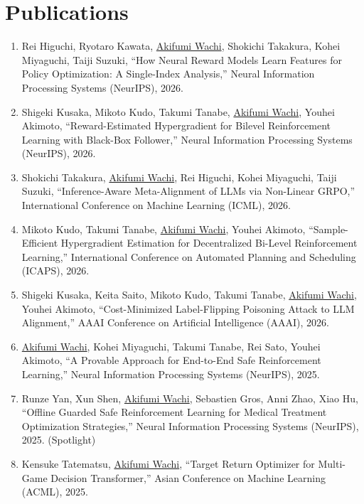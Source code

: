 \newcommand{\aw}{\underline{Akifumi Wachi}}
\section{Publications}

\begin{enumerate}[leftmargin=*,itemsep=0.35em]

\item
Rei Higuchi, Ryotaro Kawata, \aw, Shokichi Takakura, Kohei Miyaguchi, Taiji Suzuki,
``How Neural Reward Models Learn Features for Policy Optimization: A Single-Index Analysis,''
Neural Information Processing Systems (NeurIPS), 2026.

\item
Shigeki Kusaka, Mikoto Kudo, Takumi Tanabe, \aw, Youhei Akimoto,
``Reward-Estimated Hypergradient for Bilevel Reinforcement Learning with Black-Box Follower,''
Neural Information Processing Systems (NeurIPS), 2026.

\item 
Shokichi Takakura, \aw, Rei Higuchi, Kohei Miyaguchi, Taiji Suzuki,
``Inference-Aware Meta-Alignment of LLMs via Non-Linear GRPO,''
International Conference on Machine Learning (ICML), 2026.

\item
Mikoto Kudo, Takumi Tanabe, \aw, Youhei Akimoto,
``Sample-Efficient Hypergradient Estimation for Decentralized Bi-Level Reinforcement Learning,''
International Conference on Automated Planning and Scheduling (ICAPS), 2026.

\item 
Shigeki Kusaka, Keita Saito, Mikoto Kudo, Takumi Tanabe, \aw, Youhei Akimoto,
``Cost-Minimized Label-Flipping Poisoning Attack to LLM Alignment,''
AAAI Conference on Artificial Intelligence (AAAI), 2026.

\item 
\aw, Kohei Miyaguchi, Takumi Tanabe, Rei Sato, Youhei Akimoto,
``A Provable Approach for End-to-End Safe Reinforcement Learning,''
Neural Information Processing Systems (NeurIPS), 2025.

\item
Runze Yan, Xun Shen, \aw, Sebastien Gros, Anni Zhao, Xiao Hu,
``Offline Guarded Safe Reinforcement Learning for Medical Treatment Optimization Strategies,''
Neural Information Processing Systems (NeurIPS), 2025. (Spotlight)

\item 
Kensuke Tatematsu, \aw,
``Target Return Optimizer for Multi-Game Decision Transformer,''
Asian Conference on Machine Learning (ACML), 2025.


\end{enumerate}
